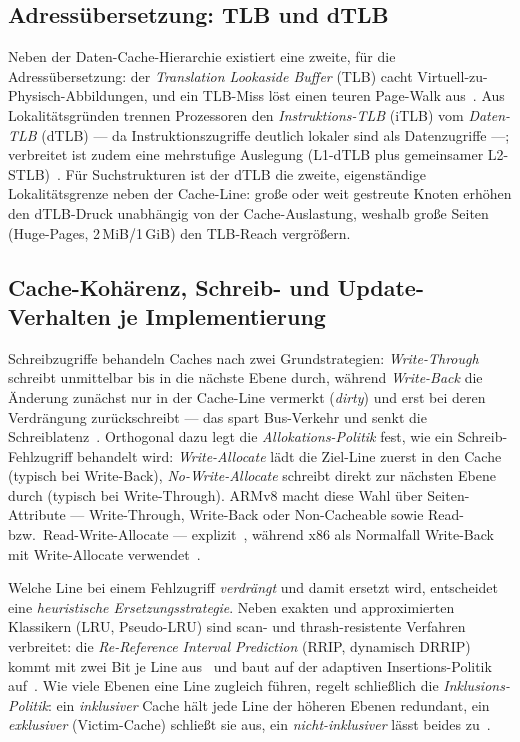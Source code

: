 \subsection{Adressübersetzung: TLB und dTLB}\label{ssec:tlb}
Neben der Daten-Cache-Hierarchie existiert eine zweite, für die Adressübersetzung: der
\emph{Translation Lookaside Buffer} (TLB) cacht Virtuell-zu-Physisch-Abbildungen, und ein TLB-Miss
löst einen teuren Page-Walk aus~\cite{hennessy2019architecture}. Aus Lokalitätsgründen trennen
Prozessoren den \emph{Instruktions-TLB} (iTLB) vom \emph{Daten-TLB} (dTLB) --- da
Instruktionszugriffe deutlich lokaler sind als Datenzugriffe ---; verbreitet ist zudem eine
mehrstufige Auslegung (L1-dTLB plus gemeinsamer L2-STLB)~\cite{intel_sdm,drepper2007memory}. Für
Suchstrukturen ist der dTLB die zweite, eigenständige Lokalitätsgrenze neben der Cache-Line: große
oder weit gestreute Knoten erhöhen den dTLB-Druck unabhängig von der Cache-Auslastung, weshalb große
Seiten (Huge-Pages, 2\,MiB/1\,GiB) den TLB-Reach vergrößern.

\subsection{Cache-Kohärenz, Schreib- und Update-Verhalten je Implementierung}\label{ssec:coherence}
Schreibzugriffe behandeln Caches nach zwei Grundstrategien: \emph{Write-Through} schreibt
unmittelbar bis in die nächste Ebene durch, während \emph{Write-Back} die Änderung zunächst nur in
der Cache-Line vermerkt (\emph{dirty}) und erst bei deren Verdrängung zurückschreibt --- das spart
Bus-Verkehr und senkt die Schreiblatenz~\cite{hennessy2019architecture}. Orthogonal dazu legt die
\emph{Allokations-Politik} fest, wie ein Schreib-Fehlzugriff behandelt wird: \emph{Write-Allocate}
lädt die Ziel-Line zuerst in den Cache (typisch bei Write-Back), \emph{No-Write-Allocate} schreibt
direkt zur nächsten Ebene durch (typisch bei Write-Through). ARMv8 macht diese Wahl über
Seiten-Attribute --- Write-Through, Write-Back oder Non-Cacheable sowie Read-
bzw.\ Read-Write-Allocate --- explizit~\cite{arm_arm}, während x86 als Normalfall Write-Back mit
Write-Allocate verwendet~\cite{intel_sdm}.

Welche Line bei einem Fehlzugriff \emph{verdrängt} und damit ersetzt wird, entscheidet eine
\emph{heuristische Ersetzungsstrategie}. Neben exakten und approximierten Klassikern (LRU,
Pseudo-LRU) sind scan- und thrash-resistente Verfahren verbreitet: die
\emph{Re-Reference Interval Prediction} (RRIP, dynamisch DRRIP) kommt mit zwei Bit je Line
aus~\cite{jaleel2010rrip} und baut auf der adaptiven Insertions-Politik
auf~\cite{qureshi2007adaptive}. Wie viele Ebenen eine Line zugleich führen, regelt schließlich die
\emph{Inklusions-Politik}: ein \emph{inklusiver} Cache hält jede Line der höheren Ebenen redundant,
ein \emph{exklusiver} (Victim-Cache) schließt sie aus, ein \emph{nicht-inklusiver} lässt beides
zu~\cite{hennessy2019architecture}.

